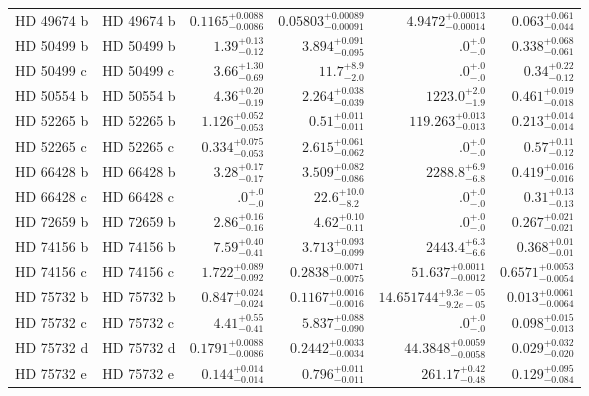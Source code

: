 \begin{longtable*}{llrrrr}
HD 49674 b & HD 49674 b & $0.1165^{+0.0088}_{-0.0086}$ & $0.05803^{+0.00089}_{-0.00091}$ & $4.9472^{+0.00013}_{-0.00014}$ & $0.063^{+0.061}_{-0.044}$ \\ 
HD 50499 b & HD 50499 b & $1.39^{+0.13}_{-0.12}$ & $3.894^{+0.091}_{-0.095}$ & $.0^{+.0}_{-.0}$ & $0.338^{+0.068}_{-0.061}$ \\ 
HD 50499 c & HD 50499 c & $3.66^{+1.30}_{-0.69}$ & $11.7^{+8.9}_{-2.0}$ & $.0^{+.0}_{-.0}$ & $0.34^{+0.22}_{-0.12}$ \\ 
HD 50554 b & HD 50554 b & $4.36^{+0.20}_{-0.19}$ & $2.264^{+0.038}_{-0.039}$ & $1223.0^{+2.0}_{-1.9}$ & $0.461^{+0.019}_{-0.018}$ \\ 
HD 52265 b & HD 52265 b & $1.126^{+0.052}_{-0.053}$ & $0.51^{+0.011}_{-0.011}$ & $119.263^{+0.013}_{-0.013}$ & $0.213^{+0.014}_{-0.014}$ \\ 
HD 52265 c & HD 52265 c & $0.334^{+0.075}_{-0.053}$ & $2.615^{+0.061}_{-0.062}$ & $.0^{+.0}_{-.0}$ & $0.57^{+0.11}_{-0.12}$ \\ 
HD 66428 b & HD 66428 b & $3.28^{+0.17}_{-0.17}$ & $3.509^{+0.082}_{-0.086}$ & $2288.8^{+6.9}_{-6.8}$ & $0.419^{+0.016}_{-0.016}$ \\ 
HD 66428 c & HD 66428 c & $.0^{+.0}_{-.0}$ & $22.6^{+10.0}_{-8.2}$ & $.0^{+.0}_{-.0}$ & $0.31^{+0.13}_{-0.13}$ \\ 
HD 72659 b & HD 72659 b & $2.86^{+0.16}_{-0.16}$ & $4.62^{+0.10}_{-0.11}$ & $.0^{+.0}_{-.0}$ & $0.267^{+0.021}_{-0.021}$ \\ 
HD 74156 b & HD 74156 b & $7.59^{+0.40}_{-0.41}$ & $3.713^{+0.093}_{-0.099}$ & $2443.4^{+6.3}_{-6.6}$ & $0.368^{+0.01}_{-0.01}$ \\ 
HD 74156 c & HD 74156 c & $1.722^{+0.089}_{-0.092}$ & $0.2838^{+0.0071}_{-0.0075}$ & $51.637^{+0.0011}_{-0.0012}$ & $0.6571^{+0.0053}_{-0.0054}$ \\ 
HD 75732 b & HD 75732 b & $0.847^{+0.024}_{-0.024}$ & $0.1167^{+0.0016}_{-0.0016}$ & $14.651744^{+9.3e-05}_{-9.2e-05}$ & $0.013^{+0.0061}_{-0.0064}$ \\ 
HD 75732 c & HD 75732 c & $4.41^{+0.55}_{-0.41}$ & $5.837^{+0.088}_{-0.090}$ & $.0^{+.0}_{-.0}$ & $0.098^{+0.015}_{-0.013}$ \\ 
HD 75732 d & HD 75732 d & $0.1791^{+0.0088}_{-0.0086}$ & $0.2442^{+0.0033}_{-0.0034}$ & $44.3848^{+0.0059}_{-0.0058}$ & $0.029^{+0.032}_{-0.020}$ \\ 
HD 75732 e & HD 75732 e & $0.144^{+0.014}_{-0.014}$ & $0.796^{+0.011}_{-0.011}$ & $261.17^{+0.42}_{-0.48}$ & $0.129^{+0.095}_{-0.084}$ \\ 

\end{longtable*}
